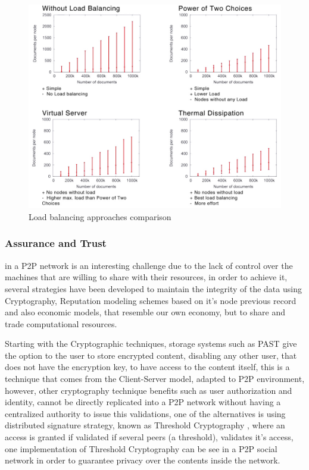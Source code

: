 \begin{figure}[h!]
  \centering
  \includegraphics[width=1\textwidth]{img/lb.jpg}
  \caption{Load balancing approaches comparison}
  \label{fig:lbcomp}
\end{figure}

\subsubsection{\textbf{Assurance and Trust}}\label{par:Assurance and Trust}

in a P2P network is an interesting challenge due to the lack of control over the machines that are willing to share with their resources, in order to achieve it, several strategies have been developed to maintain the integrity of the data using Cryptography, Reputation modeling schemes based on it's node previous record and also economic models, that resemble our own economy, but to share and trade computational resources.

Starting with the Cryptographic techniques, storage systems such as PAST give the option to the user to store encrypted content, disabling any other user, that does not have the encryption key, to have access to the content itself, this is a technique that comes from the Client-Server model, adapted to P2P environment, however, other cryptography technique benefits such as user authorization and identity, cannot be directly replicated into a P2P network without having a centralized authority to issue this validations, one of the alternatives is using distributed signature strategy, known as Threshold Cryptography \cite{Desmedt;1998}, where an access is granted if validated if several peers (a threshold), validates it's access, one implementation of Threshold Cryptography can be see in a P2P social network\cite{Afify} in order to guarantee privacy over the contents inside the network. 

